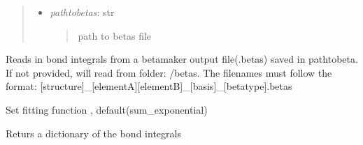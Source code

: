 \documentclass[letterpaper,10pt,english]{sphinxmanual}
\begin{document}
\begin{fulllineitems}
\begin{quote}
\begin{description}
\begin{itemize}
\item {} 
\emph{pathtobetas}: str
\begin{quote}

path to betas file
\end{quote}

\end{itemize}

\end{description}\end{quote}

\begin{fulllineitems}
Reads in bond integrals from a betamaker output file(.betas) 
saved in pathtobeta. If not provided, will read from folder:
/betas. The filenames must follow the format: 
{[}structure{]}\_{[}elementA{]}{[}elementB{]}\_{[}basis{]}\_{[}betatype{]}.betas

\end{fulllineitems}


\begin{fulllineitems}
Set fitting function , default(sum\_exponential)

\end{fulllineitems}


\begin{fulllineitems}
Returs a dictionary of the bond integrals

\end{fulllineitems}


\end{fulllineitems}

\renewcommand{\indexname}{Index}
\printindex
\end{document}
